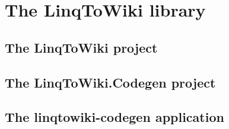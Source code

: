 \chapter{The LinqToWiki library}

\section{The LinqToWiki project}

\section{The LinqToWiki.Codegen project}

\section{The linqtowiki-codegen application}
